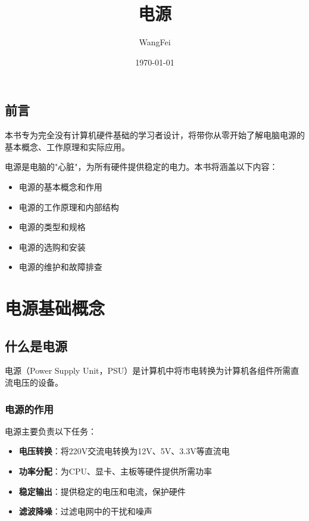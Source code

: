 \documentclass[12pt,UTF8]{ctexbook}
\title{\heiti\zihao{0} 电源}
\author{WangFei}
\date{\today}
\begin{document}
\maketitle
\tableofcontents

\frontmatter
\chapter{前言}

本书专为完全没有计算机硬件基础的学习者设计，将带你从零开始了解电脑电源的基本概念、工作原理和实际应用。

电源是电脑的"心脏"，为所有硬件提供稳定的电力。本书将涵盖以下内容：
\begin{itemize}
    \item 电源的基本概念和作用
    \item 电源的工作原理和内部结构
    \item 电源的类型和规格
    \item 电源的选购和安装
    \item 电源的维护和故障排查
\end{itemize}

\mainmatter

\part{电源基础概念}

\chapter{什么是电源}

电源（Power Supply Unit，PSU）是计算机中将市电转换为计算机各组件所需直流电压的设备。

\section{电源的作用}

电源主要负责以下任务：

\begin{itemize}[leftmargin=2em]
    \item \textbf{电压转换}：将220V交流电转换为12V、5V、3.3V等直流电
    \item \textbf{功率分配}：为CPU、显卡、主板等硬件提供所需功率
    \item \textbf{稳定输出}：提供稳定的电压和电流，保护硬件
    \item \textbf{滤波降噪}：过滤电网中的干扰和噪声
\end{itemize}
\end{document}

